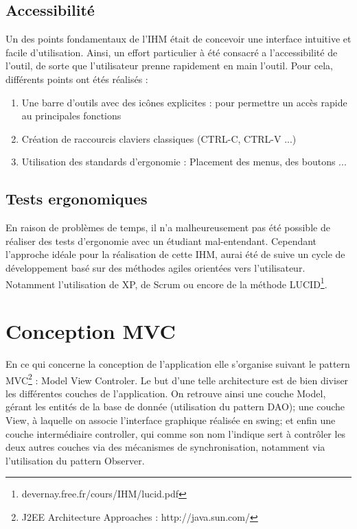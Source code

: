 \subsection{Accessibilité}

Un des points fondamentaux de l'IHM était de concevoir une interface intuitive et facile d'utilisation. Ainsi, un effort particulier à été consacré a l'accessibilité de l'outil, de sorte que l'utilisateur prenne rapidement en main l'outil. Pour cela, différents points ont étés réalisés :

\begin{enumerate}
 \item Une barre d'outils avec des icônes explicites : pour permettre un accès rapide au principales fonctions
 \item Création de raccourcis claviers classiques (CTRL-C, CTRL-V ...)
 \item Utilisation des standards d'ergonomie : Placement des menus, des boutons ...
\end{enumerate}

\subsection{Tests ergonomiques}

En raison de problèmes de temps, il n'a malheureusement pas été possible de réaliser des tests d'ergonomie avec un étudiant mal-entendant. Cependant  l'approche idéale pour la réalisation de cette IHM, aurai été de suive un cycle de développement basé sur des méthodes agiles orientées vers l'utilisateur. Notamment l'utilisation de XP, de Scrum ou encore de la méthode LUCID\footnote{devernay.free.fr/cours/IHM/lucid.pdf}.


\section{Conception MVC}

En ce qui concerne la conception de l'application elle s'organise suivant le pattern MVC\footnote{J2EE Architecture Approaches : http://java.sun.com/} : Model View Controler. Le but d'une telle architecture est de bien diviser les différentes couches de l'application. On retrouve ainsi une couche Model, gérant les entités de la base de donnée (utilisation du pattern DAO); une couche View, à laquelle on associe l'interface graphique réalisée en swing; et enfin une couche intermédiaire controller, qui comme son nom l'indique sert à contrôler les deux autres couches via des mécanismes de synchronisation, notamment via l'utilisation du pattern Observer. 



